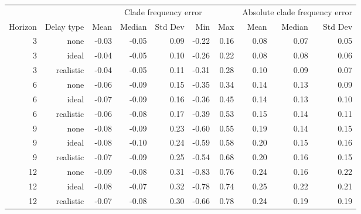 
\begin{tabular*}{1.0\textwidth}{rrrrrrrrrr}
\toprule
        &            & \multicolumn{5}{c}{Clade frequency error} & \multicolumn{3}{c}{Absolute clade frequency error} \\
Horizon & Delay type & Mean & Median & Std Dev & Min & Max & Mean & Median & Std Dev \\
\midrule

3 & none & -0.03 & -0.05 & 0.09 & -0.22 & 0.16 & 0.08 & 0.07 & 0.05 \\
3 & ideal & -0.04 & -0.05 & 0.10 & -0.26 & 0.22 & 0.08 & 0.08 & 0.06 \\
3 & realistic & -0.04 & -0.05 & 0.11 & -0.31 & 0.28 & 0.10 & 0.09 & 0.07 \\
6 & none & -0.06 & -0.09 & 0.15 & -0.35 & 0.34 & 0.14 & 0.13 & 0.09 \\
6 & ideal & -0.07 & -0.09 & 0.16 & -0.36 & 0.45 & 0.14 & 0.13 & 0.10 \\
6 & realistic & -0.06 & -0.08 & 0.17 & -0.39 & 0.53 & 0.15 & 0.14 & 0.11 \\
9 & none & -0.08 & -0.09 & 0.23 & -0.60 & 0.55 & 0.19 & 0.14 & 0.15 \\
9 & ideal & -0.08 & -0.10 & 0.24 & -0.59 & 0.58 & 0.20 & 0.15 & 0.16 \\
9 & realistic & -0.07 & -0.09 & 0.25 & -0.54 & 0.68 & 0.20 & 0.16 & 0.15 \\
12 & none & -0.09 & -0.08 & 0.31 & -0.83 & 0.76 & 0.24 & 0.16 & 0.22 \\
12 & ideal & -0.08 & -0.07 & 0.32 & -0.78 & 0.74 & 0.25 & 0.22 & 0.21 \\
12 & realistic & -0.07 & -0.08 & 0.30 & -0.66 & 0.78 & 0.24 & 0.19 & 0.19 \\

\bottomrule
\end{tabular*}

